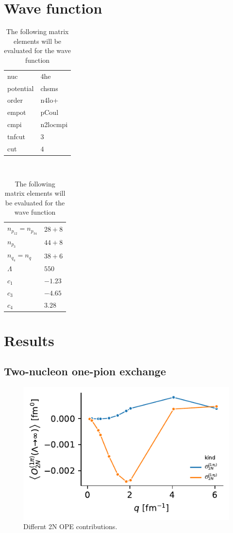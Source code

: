 \documentclass[onecolumn]{revtex4-2}
\begin{document}
\section{Wave function}
\begin{table}[htb!]
    \caption{The following matrix elements will be evaluated for the wave function}
    \label{}
    \begin{tabular}{ll}
    nuc       &       4he \\
    potential &     chsms \\
    order     &     n4lo+ \\
    empot     &     pCoul \\
    cmpi      &  n2locmpi \\
    tnfcut    &         $3$ \\
    cut       &        $4$\\
    \end{tabular}$\quad$
    \begin{tabular}{ll}
    $n_{p_{12}} = n_{p_{34}}$ &      $28+8$ \\
    $n_{p_{3}}$       &      $44+8$ \\
    $n_{q_4} = n_q$   &      $38+6$ \\
    $\Lambda$       &       $550$\\
    $c_1$        &  $-1.23$ \\
    $c_3$        &  $-4.65$ \\
    $c_4$        &  $3.28$
    \end{tabular}
\end{table}

\section{Results}


\subsection{Two-nucleon one-pion exchange}
\begin{figure}[htb!]
    \includegraphics{figs/2n-ope.pdf}
    \caption{Differnt 2N OPE contributions.}
    \label{}
\end{figure}
\end{document}
